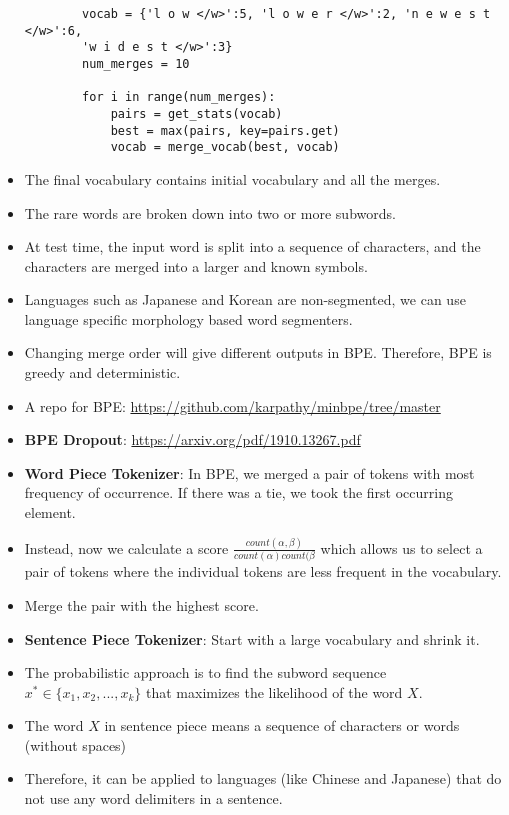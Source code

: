 \documentclass[a4paper]{article}
\begin{document}
\begin{itemize}
\begin{verbatim}
        vocab = {'l o w </w>':5, 'l o w e r </w>':2, 'n e w e s t </w>':6, 
        'w i d e s t </w>':3}
        num_merges = 10

        for i in range(num_merges):
            pairs = get_stats(vocab)
            best = max(pairs, key=pairs.get)
            vocab = merge_vocab(best, vocab)
    \end{verbatim}
    \vspace{-7mm}
    \item The final vocabulary contains initial vocabulary and all the merges.
    \item The rare words are broken down into two or more subwords.
    \item At test time, the input word is split into a sequence of characters, and the characters are merged into a larger and known symbols.
    \item Languages such as Japanese and Korean are non-segmented, we can use language specific morphology based word segmenters.
    \item Changing merge order will give different outputs in BPE. Therefore, BPE is greedy and deterministic.
    \item A repo for BPE: \url{https://github.com/karpathy/minbpe/tree/master}
    \item \textbf{BPE Dropout}: \url{https://arxiv.org/pdf/1910.13267.pdf}
    \item \textbf{Word Piece Tokenizer}: In BPE, we merged a pair of tokens with most frequency of occurrence. If there was a tie, we took the first occurring element.
    \item Instead, now we calculate a score $\frac{count(\alpha,\beta)}{count(\alpha)count(\beta}$ which allows us to select a pair of tokens where the individual tokens are less frequent in the vocabulary.
    \item Merge the pair with the highest score.
    \item \textbf{Sentence Piece Tokenizer}: Start with a large vocabulary and shrink it. 
    \item The probabilistic approach is to find the subword sequence $x^*\in \{x_1,x_2,...,x_k\}$ that maximizes the likelihood of the word $X$.
    \item The word $X$ in sentence piece means a sequence of characters or words (without spaces)
    \item Therefore, it can be applied to languages (like Chinese and Japanese) that do not use any word delimiters in a sentence.
    \begin{enumerate}

\end{enumerate}
\end{itemize}
\end{document}
